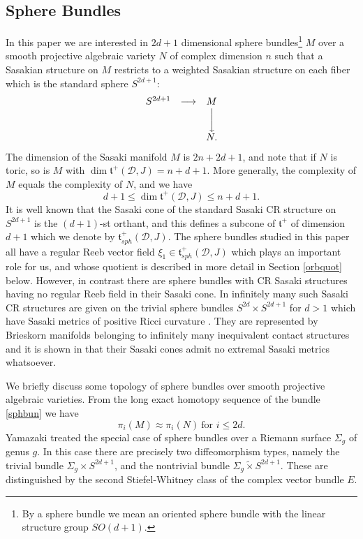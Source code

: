 \documentclass[12pt]{amsart}
\def\decdnar#1{\phantom{\hbox{$\scriptstyle{#1}$}}
\left\downarrow\vbox{\vskip15pt\hbox{$\scriptstyle{#1}$}}\right.}
\def\grS{\Sigma}
\def\cald{{\mathcal D}}
\def\gt{{\mathfrak t}}
\begin{document}
\subsection{Sphere Bundles}
In this paper we are interested in $2d+1$ dimensional sphere bundles\footnote{By a sphere bundle we mean an oriented sphere bundle with the linear structure group $SO(d+1)$.} $M$ over a smooth projective algebraic variety $N$ of complex dimension $n$ such that a Sasakian structure on $M$ restricts to a weighted Sasakian structure on each fiber which is the standard sphere $S^{2d+1}$:
\begin{equation}\label{sphbun}
\begin{matrix} S^{2d+1} &\longrightarrow &M \\
&& \decdnar{} \\
&& N.
\end{matrix}
\end{equation}
The dimension of the Sasaki manifold $M$ is $2n+2d+1$, and note that if $N$ is toric, so is $M$ with $\dim \gt^+(\cald,J)=n+d+1$. More generally, the complexity of $M$ equals the complexity of $N$, and we have 
\begin{equation}\label{dimsascone}
d+1\leq \dim\gt^+(\cald,J)\leq n+d+1.
\end{equation}
It is well known that the Sasaki cone of the standard Sasaki CR structure on $S^{2d+1}$ is the $(d+1)$-st orthant, and this defines a subcone of $\gt^+$ of dimension $d+1$ which we denote by $\gt^+_{sph}(\cald,J)$. The sphere bundles studied in this paper all have a regular Reeb vector field $\xi_1\in\gt^+_{sph}(\cald,J)$ which plays an important role for us, and whose quotient is described in more detail in Section \ref{orbquot} below. However, in contrast there are sphere bundles with CR Sasaki structures having no regular Reeb field in their Sasaki cone. In \cite{BG05h} infinitely many such Sasaki CR structures are given on the trivial sphere bundles $S^{2d}\times S^{2d+1}$ for $d>1$ which have Sasaki metrics of  positive Ricci curvature . They are represented by Brieskorn manifolds belonging to infinitely many inequivalent contact structures \cite{BMvK15} and it is shown in \cite{BovC16} that their Sasaki cones admit no extremal Sasaki metrics whatsoever.

We briefly discuss some topology of sphere bundles over smooth projective algebraic varieties. From the long exact homotopy sequence of the bundle \eqref{sphbun} we have 
\begin{equation}\label{homotopy}
\pi_i(M)\approx \pi_i(N)~ \text{for $i\leq 2d$}. 
\end{equation}
Yamazaki treated the special case of sphere bundles over a Riemann surface $\grS_g$ of genus $g$. In this case there are precisely two diffeomorphism types, namely the trivial bundle $\grS_g\times S^{2d+1}$, and the nontrivial bundle $\grS_g\widetilde{\times} S^{2d+1}$. These are distinguished by the second Stiefel-Whitney class of the complex vector bundle $E$.
\end{document}
